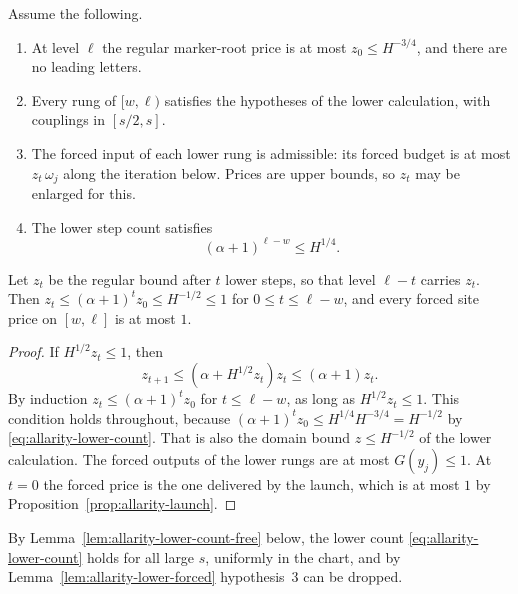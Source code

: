 \begin{lemma}\label{lem:allarity-lower-propagation}
Assume the following.
\begin{enumerate}
\item At level $\ell$ the regular marker-root price is at most
 $z_0\le H^{-3/4}$, and there are no leading letters.
\item Every rung of $[w,\ell)$ satisfies the hypotheses of the lower
 calculation, with couplings in $[s/2,s]$.
\item The forced input of each lower rung is admissible:
 its forced budget is at most $z_t\,\omega_j$ along the iteration below.
 Prices are upper bounds, so $z_t$ may be enlarged for this.
\item The lower step count satisfies
 \begin{equation}\label{eq:allarity-lower-count}
  (\alpha+1)^{\ell-w}\le H^{1/4}.
 \end{equation}
\end{enumerate}
Let $z_t$ be the regular bound after $t$ lower steps, so that level
$\ell-t$ carries $z_t$. Then $z_t\le(\alpha+1)^tz_0\le H^{-1/2}\le1$ for
$0\le t\le\ell-w$, and every forced site price on $[w,\ell]$ is at most
$1$.
\end{lemma}
\begin{proof}
If $H^{1/2}z_t\le1$, then
\[
 z_{t+1}\le(\alpha+H^{1/2}z_t)z_t\le(\alpha+1)z_t .
\]
By induction $z_t\le(\alpha+1)^tz_0$ for $t\le\ell-w$, as long as
$H^{1/2}z_t\le1$. This condition holds throughout, because
$(\alpha+1)^tz_0\le H^{1/4}H^{-3/4}=H^{-1/2}$ by
\eqref{eq:allarity-lower-count}. That is also the domain bound
$z\le H^{-1/2}$ of the lower calculation. The forced outputs of the lower
rungs are at most $G(y_j)\le1$. At $t=0$ the forced price is the one
delivered by the launch, which is at most $1$ by
Proposition~\ref{prop:allarity-launch}.
\end{proof}

By Lemma~\ref{lem:allarity-lower-count-free} below, the lower count
\eqref{eq:allarity-lower-count} holds for all large $s$, uniformly in the
chart, and by Lemma~\ref{lem:allarity-lower-forced} hypothesis~3 can be
dropped.

